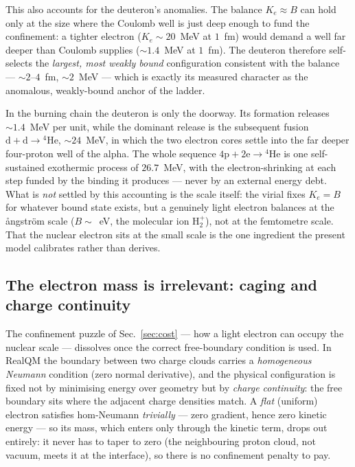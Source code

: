 \documentclass[11pt]{article}
\begin{document}
This also accounts for the deuteron's anomalies. The balance $K_e\approx B$ can hold only at the size
where the Coulomb well is just deep enough to fund the confinement: a tighter electron ($K_e\sim20$~MeV
at $1$~fm) would demand a well far deeper than Coulomb supplies ($\sim\!1.4$~MeV at $1$~fm). The
deuteron therefore self-selects the \emph{largest, most weakly bound} configuration consistent with the
balance --- $\sim\!2$--$4$~fm, $\sim\!2$~MeV --- which is exactly its measured character as the
anomalous, weakly-bound anchor of the ladder.

In the burning chain the deuteron is only the doorway. Its formation releases $\sim\!1.4$~MeV per unit,
while the dominant release is the subsequent fusion $\mathrm{d}+\mathrm{d}\to{}^4\mathrm{He}$,
$\sim\!24$~MeV, in which the two electron cores settle into the far deeper four-proton well of the
alpha. The whole sequence $4\mathrm{p}+2\mathrm{e}\to{}^4\mathrm{He}$ is one self-sustained exothermic
process of $26.7$~MeV, with the electron-shrinking at each step funded by the binding it produces ---
never by an external energy debt. What is \emph{not} settled by this accounting is the scale itself: the
virial fixes $K_e=B$ for whatever bound state exists, but a genuinely light electron balances at the
{\aa}ngstr\"om scale ($B\sim$~eV, the molecular ion $\mathrm{H}_2^+$), not at the femtometre scale.
That the nuclear electron sits at the small scale is the one ingredient the present model calibrates
rather than derives.

\subsection{The electron mass is irrelevant: caging and charge continuity}
\label{sec:caging}

The confinement puzzle of Sec.~\ref{sec:cost} --- how a light electron can occupy the nuclear scale ---
dissolves once the correct free-boundary condition is used. In RealQM the boundary between two charge
clouds carries a \emph{homogeneous Neumann} condition (zero normal derivative), and the physical
configuration is fixed not by minimising energy over geometry but by \emph{charge continuity}: the free
boundary sits where the adjacent charge densities match. A \emph{flat} (uniform) electron satisfies
hom-Neumann \emph{trivially} --- zero gradient, hence zero kinetic energy --- so its mass, which enters
only through the kinetic term, drops out entirely: it never has to taper to zero (the neighbouring
proton cloud, not vacuum, meets it at the interface), so there is no confinement penalty to pay.
\end{document}
